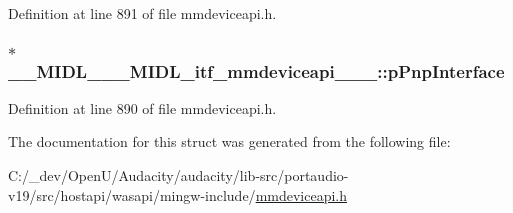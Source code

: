 Definition at line 891 of file mmdeviceapi.\+h.

\subsubsection[{\texorpdfstring{p\+Pnp\+Interface}{pPnpInterface}}]{$\ast$ \+\_\+\+\_\+\+M\+I\+D\+L\+\_\+\+\_\+\+\_\+\+M\+I\+D\+L\+\_\+itf\+\_\+mmdeviceapi\+\_\+\_\+\_\+::p\+Pnp\+Interface}\hypertarget{struct_____m_i_d_l_______m_i_d_l__itf__mmdeviceapi__0000__0006__0001_a109d271e4b6c50f7e7cde94575bebfa4}{}\label{struct_____m_i_d_l_______m_i_d_l__itf__mmdeviceapi__0000__0006__0001_a109d271e4b6c50f7e7cde94575bebfa4}


Definition at line 890 of file mmdeviceapi.\+h.



The documentation for this struct was generated from the following file\+:\begin{DoxyCompactItemize}
\item 
C\+:/\+\_\+dev/\+Open\+U/\+Audacity/audacity/lib-\/src/portaudio-\/v19/src/hostapi/wasapi/mingw-\/include/\hyperlink{mmdeviceapi_8h}{mmdeviceapi.\+h}\end{DoxyCompactItemize}
